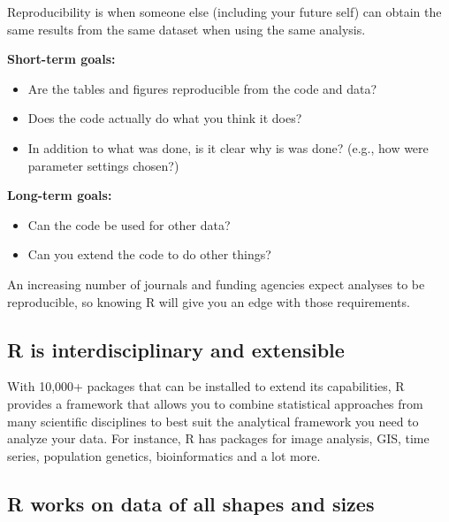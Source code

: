 \documentclass[
]{book}
\providecommand{\tightlist}{%
  \setlength{\itemsep}{0pt}\setlength{\parskip}{0pt}}
\begin{document}
Reproducibility is when someone else (including your future self) can obtain the same results from the same dataset when using the same analysis.

\textbf{Short-term goals:}

\begin{itemize}
\tightlist
\item
  Are the tables and figures reproducible from the code and data?
\item
  Does the code actually do what you think it does?
\item
  In addition to what was done, is it clear why is was done? (e.g., how were parameter settings chosen?)
\end{itemize}

\textbf{Long-term goals:}

\begin{itemize}
\tightlist
\item
  Can the code be used for other data?
\item
  Can you extend the code to do other things?
\end{itemize}

An increasing number of journals and funding agencies expect analyses to be reproducible, so knowing R will give you an edge with those requirements.

\hypertarget{r-is-interdisciplinary-and-extensible}{%
\subsection*{R is interdisciplinary and extensible}\label{r-is-interdisciplinary-and-extensible}}

With 10,000+ packages that can be installed to extend its capabilities, R provides a framework that allows you to combine statistical approaches from many scientific disciplines to best suit the analytical framework you need to analyze your data. For instance, R has packages for image analysis, GIS, time series, population genetics, bioinformatics and a lot more.

\hypertarget{r-works-on-data-of-all-shapes-and-sizes}{%
\subsection*{R works on data of all shapes and sizes}\label{r-works-on-data-of-all-shapes-and-sizes}}
\end{document}
